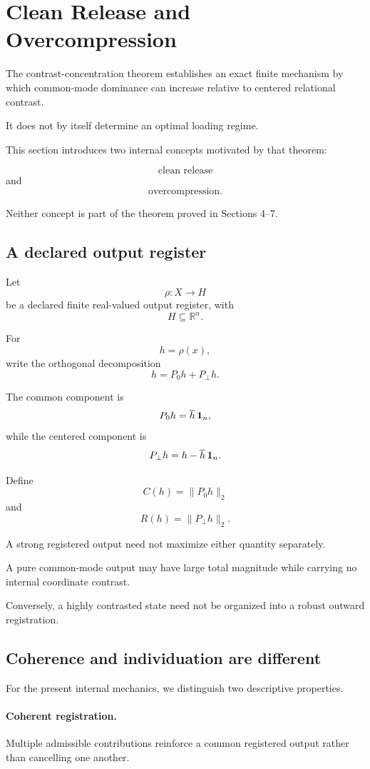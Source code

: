 \section{Clean Release and Overcompression}

The contrast-concentration theorem establishes an exact finite
mechanism by which common-mode dominance can increase relative to
centered relational contrast.

It does not by itself determine an optimal loading regime.

This section introduces two internal concepts motivated by that
theorem:

\[
\text{clean release}
\]
and
\[
\text{overcompression}.
\]

Neither concept is part of the theorem proved in Sections 4--7.

\subsection{A declared output register}

Let
\[
\rho:X\longrightarrow H
\]
be a declared finite real-valued output register, with
\[
H\subseteq\mathbb R^n.
\]

For
\[
h=\rho(x),
\]
write the orthogonal decomposition
\[
h
=
P_0h+P_\perp h.
\]

The common component is
\[
P_0h
=
\overline h\,\mathbf{1}_n,
\]
while the centered component is
\[
P_\perp h
=
h-\overline h\,\mathbf{1}_n.
\]

Define
\[
C(h)
=
\|P_0h\|_2
\]
and
\[
R(h)
=
\|P_\perp h\|_2.
\]

A strong registered output need not maximize either quantity
separately.

A pure common-mode output may have large total magnitude while
carrying no internal coordinate contrast.

Conversely, a highly contrasted state need not be organized into a
robust outward registration.

\subsection{Coherence and individuation are different}


For the present internal mechanics, we distinguish two descriptive
properties.

\paragraph{Coherent registration.}
Multiple admissible contributions reinforce a common registered output
rather than cancelling one another.

